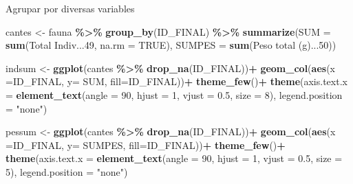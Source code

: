 \documentclass[
]{article}
\newenvironment{Shaded}{\begin{snugshade}}{\end{snugshade}}
\newcommand{\AttributeTok}[1]{\textcolor[rgb]{0.13,0.29,0.53}{#1}}
\newcommand{\ConstantTok}[1]{\textcolor[rgb]{0.56,0.35,0.01}{#1}}
\newcommand{\DecValTok}[1]{\textcolor[rgb]{0.00,0.00,0.81}{#1}}
\newcommand{\FloatTok}[1]{\textcolor[rgb]{0.00,0.00,0.81}{#1}}
\newcommand{\FunctionTok}[1]{\textcolor[rgb]{0.13,0.29,0.53}{\textbf{#1}}}
\newcommand{\NormalTok}[1]{#1}
\newcommand{\OtherTok}[1]{\textcolor[rgb]{0.56,0.35,0.01}{#1}}
\newcommand{\SpecialCharTok}[1]{\textcolor[rgb]{0.81,0.36,0.00}{\textbf{#1}}}
\newcommand{\StringTok}[1]{\textcolor[rgb]{0.31,0.60,0.02}{#1}}
\begin{document}
Agrupar por diversas variables

\begin{Shaded}
\begin{Highlighting}[]
\NormalTok{cantes }\OtherTok{\textless{}{-}}\NormalTok{ fauna }\SpecialCharTok{\%\textgreater{}\%} 
  \FunctionTok{group\_by}\NormalTok{(ID\_FINAL) }\SpecialCharTok{\%\textgreater{}\%}
  \FunctionTok{summarize}\NormalTok{(}\AttributeTok{SUM =} \FunctionTok{sum}\NormalTok{(}\StringTok{\textasciigrave{}}\AttributeTok{Total Indiv...49}\StringTok{\textasciigrave{}}\NormalTok{,}
                                     \AttributeTok{na.rm =} \ConstantTok{TRUE}\NormalTok{),}
            \AttributeTok{SUMPES =} \FunctionTok{sum}\NormalTok{(}\StringTok{\textasciigrave{}}\AttributeTok{Peso total (g)...50}\StringTok{\textasciigrave{}}\NormalTok{))}

\NormalTok{indsum }\OtherTok{\textless{}{-}} \FunctionTok{ggplot}\NormalTok{(cantes }\SpecialCharTok{\%\textgreater{}\%} 
                   \FunctionTok{drop\_na}\NormalTok{(ID\_FINAL))}\SpecialCharTok{+}
  \FunctionTok{geom\_col}\NormalTok{(}\FunctionTok{aes}\NormalTok{(}\AttributeTok{x =}\NormalTok{ID\_FINAL, }\AttributeTok{y=}\NormalTok{ SUM, }\AttributeTok{fill=}\NormalTok{ID\_FINAL))}\SpecialCharTok{+}
  \FunctionTok{theme\_few}\NormalTok{()}\SpecialCharTok{+}
  \FunctionTok{theme}\NormalTok{(}\AttributeTok{axis.text.x =} \FunctionTok{element\_text}\NormalTok{(}\AttributeTok{angle =} \DecValTok{90}\NormalTok{,}
                                     \AttributeTok{hjust =} \DecValTok{1}\NormalTok{,}
                                     \AttributeTok{vjust =} \FloatTok{0.5}\NormalTok{,}
                                     \AttributeTok{size =} \DecValTok{8}\NormalTok{),}
        \AttributeTok{legend.position =} \StringTok{"none"}\NormalTok{)}
  

\NormalTok{pessum }\OtherTok{\textless{}{-}} \FunctionTok{ggplot}\NormalTok{(cantes }\SpecialCharTok{\%\textgreater{}\%} 
                   \FunctionTok{drop\_na}\NormalTok{(ID\_FINAL))}\SpecialCharTok{+}
  \FunctionTok{geom\_col}\NormalTok{(}\FunctionTok{aes}\NormalTok{(}\AttributeTok{x =}\NormalTok{ID\_FINAL, }\AttributeTok{y=}\NormalTok{ SUMPES, }\AttributeTok{fill=}\NormalTok{ID\_FINAL))}\SpecialCharTok{+}
  \FunctionTok{theme\_few}\NormalTok{()}\SpecialCharTok{+}
  \FunctionTok{theme}\NormalTok{(}\AttributeTok{axis.text.x =} \FunctionTok{element\_text}\NormalTok{(}\AttributeTok{angle =} \DecValTok{90}\NormalTok{,}
                                     \AttributeTok{hjust =} \DecValTok{1}\NormalTok{,}
                                     \AttributeTok{vjust =} \FloatTok{0.5}\NormalTok{,}
                                     \AttributeTok{size =} \DecValTok{5}\NormalTok{),}
        \AttributeTok{legend.position =} \StringTok{"none"}\NormalTok{)}
\end{Highlighting}
\end{Shaded}
\end{document}
